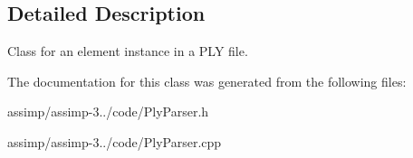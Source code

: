 \subsection{Detailed Description}
Class for an element instance in a P\+L\+Y file. 

The documentation for this class was generated from the following files\+:\begin{DoxyCompactItemize}
\item 
assimp/assimp-\/3../code/Ply\+Parser.\+h\item 
assimp/assimp-\/3../code/Ply\+Parser.\+cpp\end{DoxyCompactItemize}
